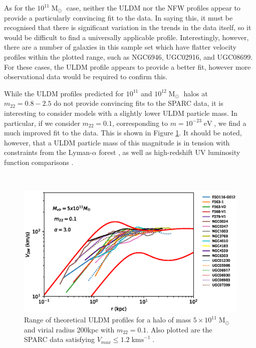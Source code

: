 \documentclass[a4paper,11pt]{article}
\begin{document}
As for the $10^{11}\operatorname{M}_{\odot}$ case, neither the ULDM nor the NFW profiles appear to provide a particularly convincing fit to the data. In saying this, it must be recognised that there is significant variation in the trends in the data itself, so it would be difficult to find a universally applicable profile. Interestingly, however, there are a number of galaxies in this sample set which have flatter velocity profiles within the plotted range, such as NGC6946, UGC02916, and UGC08699. For these cases, the ULDM profile appears to provide a better fit, however more observational data would be required to confirm this. 

While the ULDM profiles predicted for $10^{11}$ and $10^{12} \operatorname{M}_{\odot}$ halos at $m_{22} = 0.8 - 2.5$ do not provide convincing fits to  the SPARC data, it is interesting to consider models with a slightly lower ULDM particle mass. In particular, if we consider $m_{22} = 0.1$, corresponding to $m = 10^{-23} \operatorname{eV}$, we find a much improved fit to the data. This is shown in Figure \ref{fig:velocity_23}. It should be noted, however, that a ULDM particle mass of this magnitude is in tension with constraints from the Lyman-$\alpha$ forest \cite{Amendola:2005ad}, as well as high-redshift UV luminosity function comparisons \cite{Bozek:2014uqa}. 

\\
\begin{figure}
\centering
\includegraphics[scale = 0.7, trim={0cm 2.5cm 1cm 0.35cm}]{pics/best_match.eps} 
\caption{Range of theoretical ULDM profiles for a halo of mass $5\times 10^{11}\operatorname{M}_{\odot}$ and virial radius 200kpc with $m_{22} = 0.1$. Also plotted are the SPARC data satisfying $V_{max}\leq 1.2 \operatorname{kms}^{-1}$.}\label{fig:velocity_23}
\end{figure}
\end{document}
